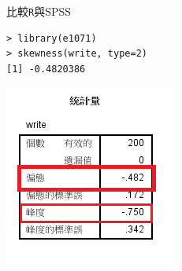 \documentclass{beamer}
\begin{document}
\begin{frame}[fragile]{比較\texttt{R}與SPSS}
\begin{Verbatim}[frame=single,label=\textit{R code}]
> library(e1071)
> skewness(write, type=2)
[1] -0.4820386
\end{Verbatim}
\centering
\includegraphics[scale=.8]{write_spss.png}
\end{frame}
\end{document}
